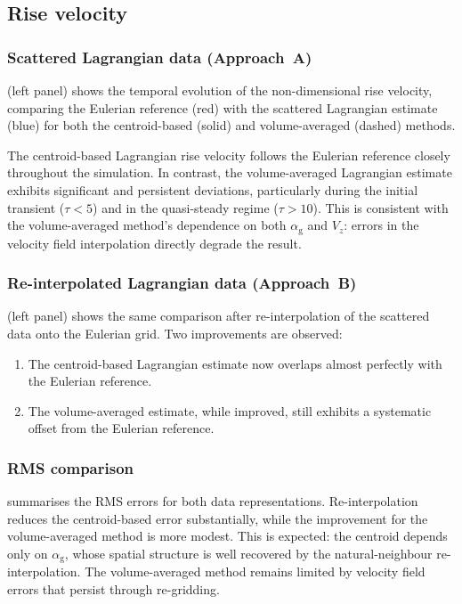 \documentclass[11pt,a4paper]{article}
\newcommand{\alphag}{\alpha_{\mathrm{g}}}
\newcommand{\Vz}{V_z}
\begin{document}
\subsection{Rise velocity}\label{sec:results_rise}

\subsubsection{Scattered Lagrangian data (Approach~A)}

 (left panel) shows the temporal evolution of the
non-dimensional rise velocity, comparing the Eulerian reference (red) with
the scattered Lagrangian estimate (blue) for both the centroid-based (solid)
and volume-averaged (dashed) methods.

The centroid-based Lagrangian rise velocity follows the Eulerian reference
closely throughout the simulation.  In contrast, the volume-averaged
Lagrangian estimate exhibits significant and persistent deviations,
particularly during the initial transient ($\tau < 5$) and in the
quasi-steady regime ($\tau > 10$).  This is consistent with the
volume-averaged method's dependence on both $\alphag$ and $\Vz$: errors in
the velocity field interpolation directly degrade the result.

\subsubsection{Re-interpolated Lagrangian data (Approach~B)}

 (left panel) shows the same comparison after
re-interpolation of the scattered data onto the Eulerian grid.  Two
improvements are observed:
\begin{enumerate}[label=(\arabic*)]
  \item The centroid-based Lagrangian estimate now overlaps almost perfectly
    with the Eulerian reference.
  \item The volume-averaged estimate, while improved, still exhibits a
    systematic offset from the Eulerian reference.
\end{enumerate}

\subsubsection{RMS comparison}

 summarises the RMS errors for both data representations.
Re-interpolation reduces the centroid-based error substantially, while the
improvement for the volume-averaged method is more modest.  This is expected:
the centroid depends only on $\alphag$, whose spatial structure is well
recovered by the natural-neighbour re-interpolation.  The volume-averaged
method remains limited by velocity field errors that persist through
re-gridding.
\end{document}
